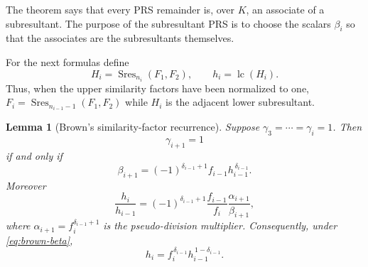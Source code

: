 \documentclass[11pt]{book}
\newtheorem{lemma}[theorem]{Lemma}
\theoremstyle{definition}
\begin{document}
The theorem says that every PRS remainder is, over $K$, an associate of a
subresultant.  The purpose of the subresultant PRS is to choose the scalars
$\beta_i$ so that the associates are the subresultants themselves.

For the next formulas define
\[
 H_i=\operatorname{Sres}_{n_i}(F_1,F_2),
 \qquad
 h_i=\operatorname{lc}(H_i).
\]
Thus, when the upper similarity factors have been normalized to one,
$F_i=\operatorname{Sres}_{n_{i-1}-1}(F_1,F_2)$ while $H_i$ is the adjacent
lower subresultant.

\begin{lemma}[Brown's similarity-factor recurrence]
\label{lem:brown-similarity-recurrence}
Suppose $\gamma_3=\cdots=\gamma_i=1$.  Then
\begin{equation}\label{eq:brown-beta-condition}
 \gamma_{i+1}=1
\end{equation}
if and only if
\begin{equation}\label{eq:brown-beta}
 \beta_{i+1}
 =(-1)^{\delta_{i-1}+1}
   f_{i-1}h_{i-1}^{\,\delta_{i-1}}.
\end{equation}
Moreover
\begin{equation}\label{eq:brown-h-ratio}
 \frac{h_i}{h_{i-1}}
 =(-1)^{\delta_{i-1}+1}
   \frac{f_{i-1}}{f_i}
   \frac{\alpha_{i+1}}{\beta_{i+1}},
\end{equation}
where
$\alpha_{i+1}=f_i^{\delta_{i-1}+1}$ is the pseudo-division multiplier.
Consequently, under \eqref{eq:brown-beta},
\begin{equation}\label{eq:brown-h-recurrence}
 h_i=f_i^{\,\delta_{i-1}}
     h_{i-1}^{\,1-\delta_{i-1}}.
\end{equation}
\end{lemma}
\end{document}
